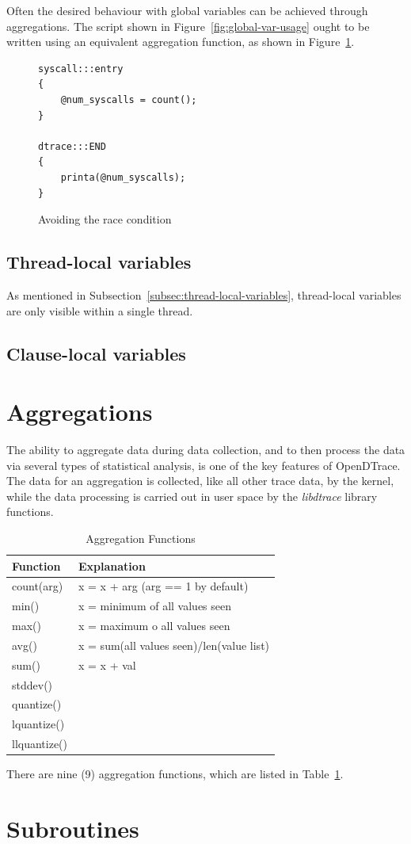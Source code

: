 \noindent
Often the desired behaviour with global variables can be achieved through
aggregations. The script shown in Figure~\ref{fig:global-var-usage} ought to be
written using an equivalent aggregation function, as shown in
Figure~\ref{fig:avoiding-the-race}.

\begin{figure}
  \begin{lstlisting}
syscall:::entry
{
    @num_syscalls = count();
}

dtrace:::END
{
    printa(@num_syscalls);
}
  \end{lstlisting}
  \caption{Avoiding the race condition}
  \label{fig:avoiding-the-race}
\end{figure}

\subsection{Thread-local variables}

As mentioned in Subsection~\ref{subsec:thread-local-variables}, thread-local
variables are only visible within a single thread.

\subsection{Clause-local variables}

\section{Aggregations}
\label{sec:aggregations}

The ability to aggregate data during data collection, and to then
process the data via several types of statistical analysis, is one of
the key features of OpenDTrace.  The data for an aggregation is
collected, like all other trace data, by the kernel, while the data
processing is carried out in user space by the \emph{libdtrace}
library functions.

\begin{table}
  \centering
  \begin{tabular}{l|l}
    Function & Explanation\\
    \hline
    count(arg) & x = x + arg (arg == 1 by default)\\
    min() & x = minimum of all values seen\\
    max() & x = maximum o all values seen\\
    avg() & x = sum(all values seen)/len(value list)\\
    sum() & x = x + val\\
    stddev() & \\
    quantize() & \\
    lquantize() & \\
    llquantize() &
  \end{tabular}
  \caption{Aggregation Functions}
  \label{tab:agg-func}
\end{table}

There are nine (9) aggregation functions, which are listed in
Table~\ref{tab:agg-func}.

\section{Subroutines}
\label{sec:subroutines}

